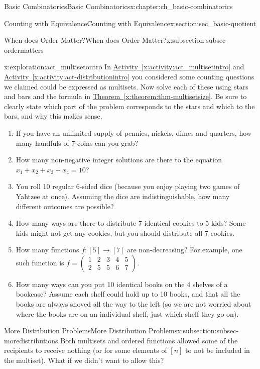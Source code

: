 \documentclass[oneside,10pt,]{book}
\numberwithin{equation}{chapter}
\newcommand{\twoline}[2]{\begin{pmatrix}#1 \\ #2 \end{pmatrix}}
\newcommand{\amp}{&}
\begin{document}
\begin{chapterptx}{Basic Combinatorics}{}{Basic Combinatorics}{}{}{x:chapter:ch_basic-combinatorics}
\begin{sectionptx}{Counting with Equivalence}{}{Counting with Equivalence}{}{}{x:section:sec_basic-quotient}
\begin{subsectionptx}{When does Order Matter?}{}{When does Order Matter?}{}{}{x:subsection:subsec-ordermatters}
\begin{exploration}{}{x:exploration:act_multisetoutro}%
In \hyperref[x:activity:act_multisetintro]{Activity~\ref{x:activity:act_multisetintro}} and \hyperref[x:activity:act-distributionintro]{Activity~\ref{x:activity:act-distributionintro}} you considered some counting questions we claimed could be expressed as multisets.  Now solve each of these using stars and bars and the formula in \hyperref[x:theorem:thm-multisetsize]{Theorem~\ref{x:theorem:thm-multisetsize}}.  Be sure to clearly state which part of the problem corresponds to the stars and which to the bars, and why this makes sense.%
\begin{enumerate}[font=\bfseries,label=(\alph*),ref=\alph*]
\item{}If you have an unlimited supply of pennies, nickels, dimes and quarters, how many handfuls of 7 coins can you grab?%
\item{}How many non-negative integer solutions are there to the equation \(x_1 + x_2 + x_3 + x_4 = 10\)?%
\item{}You roll 10 regular 6-sided dice (because you enjoy playing two games of Yahtzee at once).  Assuming the dice are indistinguishable, how many different outcomes are possible?%
\item{}How many ways are there to distribute 7 identical cookies to 5 kids? Some kids might not get any cookies, but you should distribute all 7 cookies.%
\item{}How many functions \(f:[5] \to [7]\) are non-decreasing?  For example, one such function is \(f = \twoline{1 \amp 2 \amp 3 \amp 4 \amp 5}{2 \amp 5 \amp 5 \amp 6 \amp 7}\).%
\item{}How many ways can you put 10 identical books on the 4 shelves of a bookcase?  Assume each shelf could hold up to 10 books, and that all the books are always shoved all the way to the left (so we are not worried about where the books are on an individual shelf, just which shelf they go on).%
\end{enumerate}
\end{exploration}
\end{subsectionptx}
%
%
\typeout{************************************************}
\typeout{************************************************}
%
\begin{subsectionptx}{More Distribution Problems}{}{More Distribution Problems}{}{}{x:subsection:subsec-moredistributions}
Both multisets and ordered functions allowed some of the recipients to receive nothing (or for some elements of \([n]\) to not be included in the multiset).  What if we didn't want to allow this?%

\end{subsectionptx}
\end{sectionptx}
\end{chapterptx}
\end{document}
